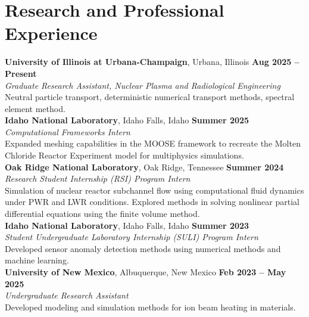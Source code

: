 \section{\mysidestyle Research and Professional Experience}

\textbf{University of Illinois at Urbana-Champaign}, Urbana, Illinois \hfill \textbf{Aug 2025 -- Present}\\
\textsl{Graduate Research Assistant, Nuclear Plasma and Radiological Engineering}\\
Neutral particle transport, deterministic numerical transport methods, spectral element method.\\

\textbf{Idaho National Laboratory}, Idaho Falls, Idaho \hfill \textbf{Summer 2025}\\
\textsl{Computational Frameworks Intern}\\
Expanded meshing capabilities in the MOOSE framework to recreate the Molten Chloride Reactor Experiment model for multiphysics simulations.\\

\textbf{Oak Ridge National Laboratory}, Oak Ridge, Tennessee \hfill \textbf{Summer 2024}\\
\textsl{Research Student Internship (RSI) Program Intern}\\
Simulation of nuclear reactor subchannel flow using computational fluid dynamics under PWR and LWR conditions.
Explored methods in solving nonlinear partial differential equations using the finite volume method.\\

\textbf{Idaho National Laboratory}, Idaho Falls, Idaho \hfill \textbf{Summer 2023}\\
\textsl{Student Undergraduate Laboratory Internship (SULI) Program Intern}\\
Developed sensor anomaly detection methods using numerical methods and machine learning.\\

\textbf{University of New Mexico}, Albuquerque, New Mexico \hfill \textbf{Feb 2023 -- May 2025}\\
\textsl{Undergraduate Research Assistant}\\
Developed modeling and simulation methods for ion beam heating in materials.\\
